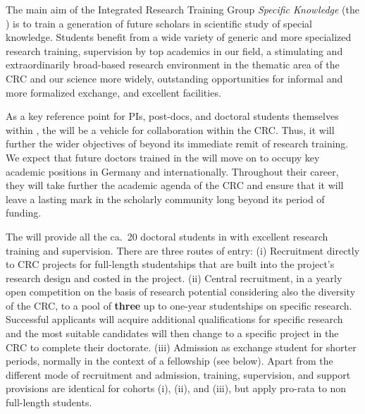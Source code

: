 
\notocsubsection{\pipl}
\begin{giprenv}
  
\end{giprenv}
\gicolsep
\begin{giprenv}
  
\end{giprenv}


\notocsubsection{\prsum}



The main aim of the Integrated Research Training Group \emph{Specific
  Knowledge} (the ) is to train a generation of future
scholars in scientific study of special knowledge. Students benefit
from a wide variety of generic and more specialized research training,
supervision by top academics in our field, a stimulating and
extraordinarily broad-based research environment in the thematic area
of the CRC and our science more widely, outstanding opportunities for
informal and more formalized exchange, and excellent facilities.

As a key reference point for PIs, post-docs, and doctoral students
themselves within \thiscrc, the  will be a vehicle for
collaboration within the CRC. Thus, it will further the wider
objectives of \thiscrc{} beyond its immediate remit of research
training.  We expect that future doctors trained in the  will
move on to occupy key academic positions in Germany and
internationally. Throughout their career, they will take further the
academic agenda of the CRC and ensure that it will leave a lasting
mark in the scholarly community long beyond its period of funding.


The  will provide all the ca.~20 doctoral students in
\thiscrc{} with excellent research training and supervision.  There
are three routes of entry: (i) Recruitment directly to CRC projects
for full-length studentships that are built into the project’s
research design and costed in the project. (ii) Central recruitment,
in a yearly open competition on the basis of research potential
considering also the diversity of the CRC, to a pool of \textbf{three}
up to one-year studentships on specific research. Successful
applicants will acquire additional qualifications for specific
research and the most suitable candidates will then change to a
specific project in the CRC to complete their doctorate.  (iii)
Admission as exchange student for shorter periods, normally in the
context of a fellowship (see below).  Apart from the different mode of
recruitment and admission, training, supervision, and support
provisions are identical for cohorts (i), (ii), and (iii), but apply
pro-rata to non full-length students.


